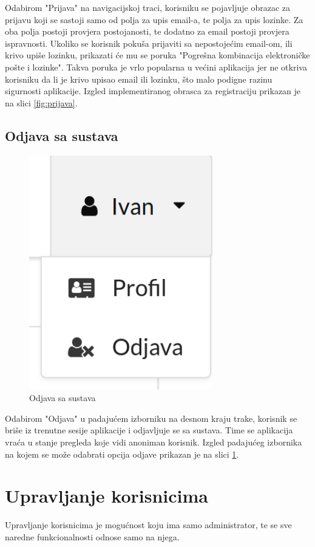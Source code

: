 \documentclass[zavrsni, numeric]{fer}
\begin{document}
Odabirom "Prijava" na navigacijskoj traci, korisniku se pojavljuje obrazac za prijavu koji se sastoji samo od polja za upis email-a, te polja za upis lozinke. Za oba polja postoji provjera postojanosti, te dodatno za email postoji provjera ispravnosti. Ukoliko se korisnik pokuša prijaviti sa nepostojećim email-om, ili krivo upiše lozinku, prikazati će mu se poruka "Pogrešna kombinacija elektroničke pošte i lozinke". Takva poruka je vrlo popularna u većini aplikacija jer ne otkriva korisniku da li je krivo upisao email ili lozinku, što malo podigne razinu sigurnosti aplikacije. Izgled implementiranog obrasca za registraciju prikazan je na slici \ref{fig:prijava}.

\subsection{Odjava sa sustava}

\begin{figure}[H]
	\centering
	\includegraphics[width=8cm]{slike/odjava.png}
	\caption{Odjava sa sustava}
	\label{fig:odjava}
\end{figure}
	
Odabirom "Odjava" u padajućem izborniku na desnom kraju trake, korisnik se briše iz trenutne sesije aplikacije i odjavljuje se sa sustava. Time se aplikacija vraća u stanje pregleda koje vidi anoniman korisnik. Izgled padajućeg izbornika na kojem se može odabrati opcija odjave prikazan je na slici \ref{fig:odjava}.

\section{Upravljanje korisnicima}
Upravljanje korisnicima je mogućnost koju ima samo administrator, te se sve naredne funkcionalnosti odnose samo na njega.
\end{document}
